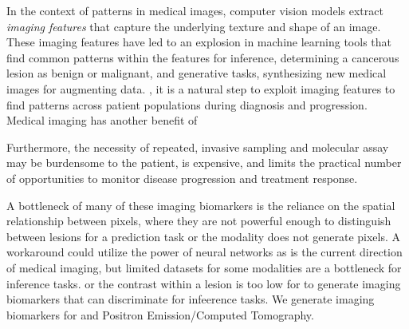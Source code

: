 
In the context of patterns in medical images, computer vision models extract \textit{imaging features} that capture the underlying texture and shape of an image.  These imaging features have led to an explosion in machine learning tools that find common patterns within the features for inference, determining a cancerous lesion as benign or malignant, and generative tasks, synthesizing new medical images for augmenting data. , it is a natural step to exploit imaging features to find patterns across patient populations during diagnosis and progression.  Medical imaging has another benefit of

Furthermore, the necessity of repeated, invasive sampling and molecular assay may be burdensome to the patient, is expensive, and limits the practical number of opportunities to monitor disease progression and treatment response.   

A bottleneck of many of these imaging biomarkers is the reliance on the spatial relationship between pixels, where they are not powerful enough to distinguish between lesions for a prediction task or the modality does not generate pixels.  A workaround could utilize the power of neural networks as is the current direction of medical imaging, but limited datasets for some modalities are a bottleneck for inference tasks.   or the contrast within a lesion is too low for to generate imaging biomarkers that can discriminate for infeerence tasks.  We generate imaging biomarkers for and Positron Emission/Computed Tomography.    







